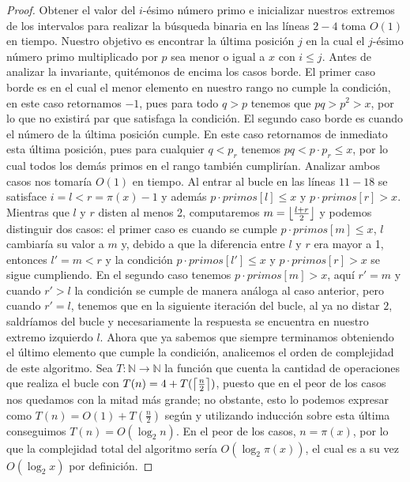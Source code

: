 \documentclass[10pt]{article}
\DeclarePairedDelimiter\ceil{\lceil}{\rceil}
\DeclarePairedDelimiter\floor{\lfloor}{\rfloor}
\theoremstyle{definition}
\theoremstyle{remark}
\newcommand{\BN}{\mathbb N}
\begin{document}
\begin{proof}
Obtener el valor del $i$-\'esimo n\'umero primo e inicializar
nuestros extremos de los intervalos para realizar la b\'usqueda binaria en las l\'ineas
$2 - 4$ toma $O(1)$ en tiempo.
Nuestro objetivo es encontrar la \'ultima posici\'on $j$ en la cual
el $j$-\'esimo n\'umero primo multiplicado por $p$ sea menor o igual a $x$ con $i \leq j$. Antes de analizar la invariante, quit\'emonos de encima los casos borde.
El primer caso borde es en el cual el menor elemento en nuestro rango no cumple la condici\'on,
en este caso retornamos $-1$, pues para todo $q > p$ tenemos que $pq > p^2 > x$,
por lo que no existir\'a par que satisfaga la condici\'on.
El segundo caso borde es cuando el n\'umero de la \'ultima posici\'on cumple.
En este caso retornamos de inmediato esta \'ultima posici\'on,
pues para cualquier $q < p_r$ tenemos $pq < p \cdot p_r \leq x$,
por lo cual todos los dem\'as primos en el rango tambi\'en cumplir\'ian.
Analizar ambos casos nos tomar\'ia $O(1)$ en tiempo.
Al entrar al bucle en las l\'ineas $11 - 18$ se satisface $i = l < r = \pi(x) - 1$ y adem\'as
$p \cdot primos[l] \leq x$ y $p \cdot primos[r] > x$.
Mientras que $l$ y $r$ disten al menos 2, computaremos $m = \floor*{\frac{l + r}{2}}$
y podemos distinguir dos casos:
el primer caso es cuando se cumple $p \cdot primos[m] \leq x$, $l$ cambiar\'ia
su valor a $m$ y, debido a que la diferencia entre $l$ y $r$ era mayor a 1, entonces
$l' = m < r$ y la condici\'on $p \cdot primos[l'] \leq x$ y $p \cdot primos[r] > x$ se sigue cumpliendo.
En el segundo caso tenemos $p \cdot primos[m] > x$, aqu\'i $r' = m$ y cuando $r' > l$ la condici\'on se cumple de manera an\'aloga al caso anterior,
pero cuando $r' = l$, tenemos que en la siguiente iteraci\'on del bucle, al ya no distar $2$, saldr\'iamos del bucle
y necesariamente la respuesta se encuentra en nuestro extremo izquierdo $l$.
Ahora que ya sabemos que siempre terminamos obteniendo el \'ultimo elemento que cumple la condici\'on, analicemos el
orden de complejidad de este algoritmo. Sea $T: \BN \to \BN$ la funci\'on que cuenta la cantidad de operaciones
que realiza el bucle con $T(n) = 4 + T(\ceil*{\frac{n}{2}})$,
puesto que en el peor de los casos nos quedamos con la mitad m\'as grande;
no obstante, esto lo podemos expresar como $T(n) = O(1) + T(\frac{n}{2})$ seg\'un \cite{CLRS}
y utilizando inducci\'on sobre esta \'ultima conseguimos $T(n) = O(\log_2 n)$.
En el peor de los casos, $n = \pi(x)$, por lo que la complejidad total del algoritmo ser\'ia
$O(\log_2 \pi(x))$, el cual es a su vez $O(\log_2 x)$ por definici\'on.
\end{proof}
\end{document}

